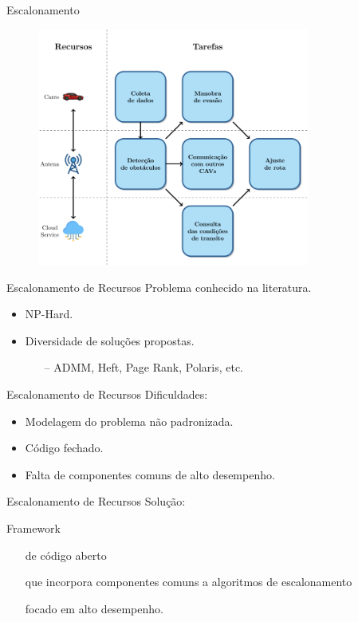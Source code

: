 \begin{frame}{Escalonamento}
    \begin{figure}
        \centering
        \includegraphics[width=0.8\textwidth]{Figuras/cav-scheduling.png}
    \end{figure}
\end{frame}

\begin{frame}{Escalonamento de Recursos}
    Problema conhecido na literatura.
    \begin{itemize}
        \item NP-Hard.
        \item Diversidade de soluções propostas.
        \begin{itemize}
            \item[--] ADMM, Heft, Page Rank, Polaris, etc.
        \end{itemize}
    \end{itemize}
\end{frame}

\begin{frame}{Escalonamento de Recursos}
    Dificuldades:
    \begin{itemize}
        \item Modelagem do problema não padronizada.
        \item Código fechado.
        \item Falta de componentes comuns de alto desempenho.
    \end{itemize}
\end{frame}

\begin{frame}{Escalonamento de Recursos}
    Solução:

    Framework
    \begin{itemize}
        \item[] de código aberto
        \item[] que incorpora componentes comuns a algoritmos de escalonamento
        \item[] focado em alto desempenho.
    \end{itemize}
\end{frame}
